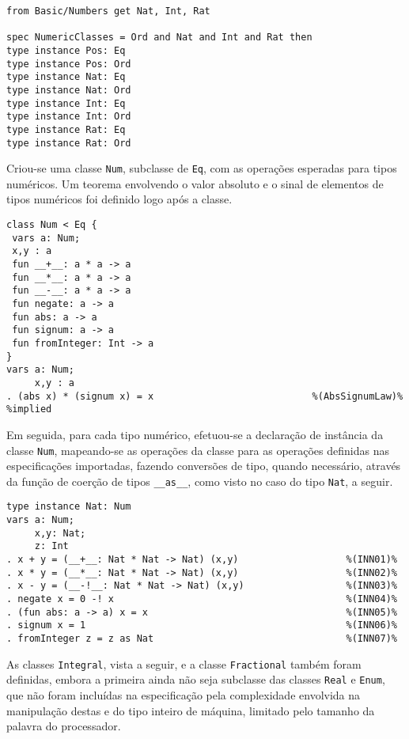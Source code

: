 \begin{Verbatim}
from Basic/Numbers get Nat, Int, Rat

spec NumericClasses = Ord and Nat and Int and Rat then
type instance Pos: Eq
type instance Pos: Ord
type instance Nat: Eq
type instance Nat: Ord
type instance Int: Eq
type instance Int: Ord
type instance Rat: Eq
type instance Rat: Ord
\end{Verbatim}

Criou-se uma classe \Verb.Num., subclasse de \Verb.Eq., com as operações esperadas para tipos numéricos.
Um teorema envolvendo o valor absoluto e o sinal de elementos de tipos numéricos foi definido logo após a classe.

\begin{Verbatim}
class Num < Eq {
 vars a: Num;
 x,y : a
 fun __+__: a * a -> a
 fun __*__: a * a -> a
 fun __-__: a * a -> a
 fun negate: a -> a
 fun abs: a -> a
 fun signum: a -> a
 fun fromInteger: Int -> a
}
vars a: Num;
     x,y : a
. (abs x) * (signum x) = x                            %(AbsSignumLaw)% %implied
\end{Verbatim}

Em seguida, para cada tipo numérico, efetuou-se a declaração de instância da classe \Verb.Num., mapeando-se as operações da classe para as operações definidas nas especificações importadas, fazendo conversões de tipo, quando necessário, através da função de coerção de tipos \Verb.__as__., como visto no caso do tipo \Verb.Nat., a seguir.
\begin{Verbatim}
type instance Nat: Num                                     
vars a: Num;                                               
     x,y: Nat;                                             
     z: Int                                                
. x + y = (__+__: Nat * Nat -> Nat) (x,y)                   %(INN01)%
. x * y = (__*__: Nat * Nat -> Nat) (x,y)                   %(INN02)%
. x - y = (__-!__: Nat * Nat -> Nat) (x,y)                  %(INN03)%
. negate x = 0 -! x                                         %(INN04)%
. (fun abs: a -> a) x = x                                   %(INN05)%
. signum x = 1                                              %(INN06)%
. fromInteger z = z as Nat                                  %(INN07)%
\end{Verbatim}

As classes \Verb.Integral., vista a seguir, e a classe \Verb.Fractional. também foram definidas, embora a primeira ainda não seja subclasse das classes \Verb.Real. e \Verb.Enum., que não foram incluídas na especificação pela complexidade envolvida na manipulação destas e do tipo inteiro de máquina, limitado pelo tamanho da palavra do processador.

